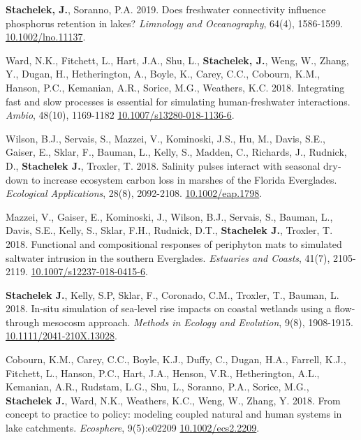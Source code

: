 \item \textbf{Stachelek, J.}, Soranno, P.A. 2019. Does freshwater connectivity influence phosphorus retention in lakes? \emph{Limnology and Oceanography}, 64(4), 1586-1599. \href{https://doi.org/10.1002/lno.11137}{10.1002/lno.11137}. %

\item Ward, N.K., Fitchett, L., Hart, J.A., Shu, L., \textbf{Stachelek, J.}, Weng, W., Zhang, Y., Dugan, H., Hetherington, A., Boyle, K., Carey, C.C., Cobourn, K.M., Hanson, P.C., Kemanian, A.R., Sorice, M.G., Weathers, K.C. 2018. Integrating fast and slow processes is essential for simulating human-freshwater interactions. \emph{Ambio}, 48(10), 1169-1182 \href{https://doi.org/10.1007/s13280-018-1136-6}{10.1007/s13280-018-1136-6}. %

\item Wilson, B.J., Servais, S., Mazzei, V., Kominoski, J.S., Hu, M., Davis, S.E., Gaiser, E., Sklar, F., Bauman, L., Kelly, S., Madden, C., Richards, J., Rudnick, D., \textbf{Stachelek J.}, Troxler, T. 2018. Salinity pulses interact with seasonal dry‐down to increase ecosystem carbon loss in marshes of the Florida Everglades. \emph{Ecological Applications}, 28(8), 2092-2108. \href{https://doi.org/10.1002/eap.1798}{10.1002/eap.1798}. %

\item Mazzei, V., Gaiser, E., Kominoski, J., Wilson, B.J., Servais, S., Bauman, L., Davis, S.E., Kelly, S., Sklar, F.H., Rudnick, D.T., \textbf{Stachelek J.}, Troxler, T. 2018. Functional and compositional responses of periphyton mats to simulated saltwater intrusion in the southern Everglades. \emph{Estuaries and Coasts}, 41(7), 2105-2119. \href{https://doi.org/10.1007/s12237-018-0415-6}{10.1007/s12237-018-0415-6}. %

\item \textbf{Stachelek J.}, Kelly, S.P, Sklar, F., Coronado, C.M., Troxler, T., Bauman, L. 2018. In-situ simulation of sea-level rise impacts on coastal wetlands using a flow-through mesocosm approach. \emph{Methods in Ecology and Evolution}, 9(8), 1908-1915. \href{https://doi.org/10.1111/2041-210X.13028}{10.1111/2041-210X.13028}. %

\item Cobourn, K.M., Carey, C.C., Boyle, K.J., Duffy, C., Dugan, H.A., Farrell, K.J., Fitchett, L., Hanson, P.C., Hart, J.A., Henson, V.R., Hetherington, A.L., Kemanian, A.R., Rudstam, L.G., Shu, L., Soranno, P.A., Sorice, M.G., \textbf{Stachelek J.}, Ward, N.K., Weathers, K.C., Weng, W., Zhang, Y. 2018. From concept to practice to policy: modeling coupled natural and human systems in lake catchments. \emph{Ecosphere}, 9(5):e02209 \href{https://doi.org/10.1002/ecs2.2209}{10.1002/ecs2.2209}. %

